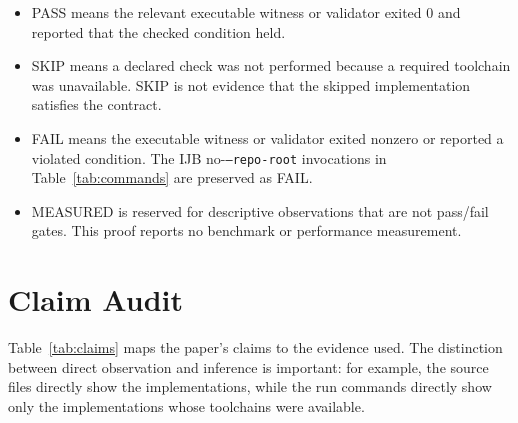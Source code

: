 \documentclass[11pt,letterpaper]{article}
\begin{document}
\begin{itemize}
  \item PASS means the relevant executable witness or validator exited
        0 and reported that the checked condition held.
  \item SKIP means a declared check was not performed because a required
        toolchain was unavailable. SKIP is not evidence that the skipped
        implementation satisfies the contract.
  \item FAIL means the executable witness or validator exited nonzero or
        reported a violated condition. The IJB no-\texttt{--repo-root}
        invocations in Table~\ref{tab:commands} are preserved as FAIL.
  \item MEASURED is reserved for descriptive observations that are not
        pass/fail gates. This proof reports no benchmark or performance
        measurement.
\end{itemize}

\section{Claim Audit}

Table~\ref{tab:claims} maps the paper's claims to the evidence used.
The distinction between direct observation and inference is important:
for example, the source files directly show the implementations, while
the run commands directly show only the implementations whose
toolchains were available.
\end{document}
